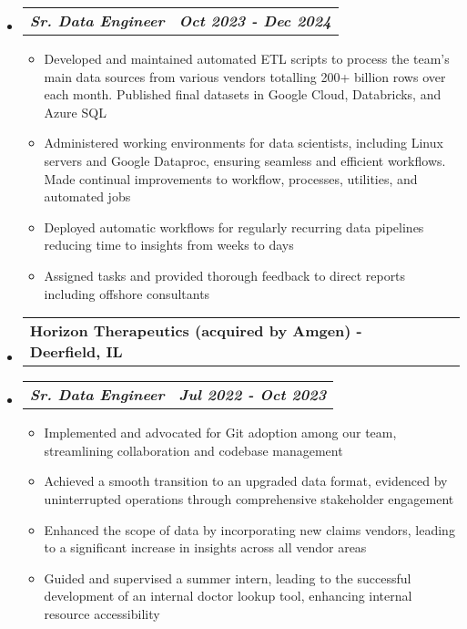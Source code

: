 \documentclass[letterpaper,11pt]{article}
\makeatletter
\newcommand{\resumeItem}[1]{
  \item\small{
    {#1 \vspace{0pt}}
  }
}
\newcommand{\resumeSubheading}[2]{
  \vspace{-1pt}\item
    \begin{tabular*}{0.97\textwidth}[t]{l@{\extracolsep{\fill}}r}
      \textbf{\small#1 - \small#2} 
    \end{tabular*}\vspace{-13pt}
}
\newcommand{\resumeSubSubheading}[2]{
    \item
    \vspace{2pt}
    \begin{tabular*}{0.97\textwidth}{l@{\extracolsep{\fill}}r}
      \textbf{\textit{\small#1}} & \textbf{\textit{\small#2}} \\
    \end{tabular*}\vspace{-5pt}
}
\newcommand{\resumeHeadingListStart}{\begin{itemize}[leftmargin=0.05in, label={}]}
\newcommand{\resumeHeadingListEnd}{\end{itemize}}
\newcommand{\resumeSubHeadingListStart}{\begin{itemize}[leftmargin=0.15in, label={}]}
\newcommand{\resumeSubHeadingListEnd}{\end{itemize}\vspace{-15pt}}
\newcommand{\resumeItemListStart}{\begin{itemize}[leftmargin=0.15in]}
\newcommand{\resumeItemListEnd}{\end{itemize}\vspace{-10pt}}
\makeatother
\begin{document}
        \resumeSubHeadingListStart
            \resumeSubSubheading {Sr. Data Engineer}{Oct 2023 - Dec 2024}
            \resumeItemListStart
                \resumeItem{Developed and maintained automated ETL scripts to process the team's
                            main data sources from various vendors totalling 200+ billion rows over each month. Published 
                            final datasets in Google Cloud, Databricks, and Azure SQL}
                \resumeItem{Administered working environments for data scientists, including Linux servers 
                            and Google Dataproc, ensuring seamless and efficient 
                            workflows. Made continual improvements to workflow, processes, utilities, and automated 
                            jobs}
                \resumeItem{Deployed automatic workflows for regularly recurring data pipelines reducing time to insights from weeks to days}
                \resumeItem{Assigned tasks and provided thorough feedback to direct reports including offshore consultants }
            \resumeItemListEnd
        \resumeSubHeadingListEnd
    \resumeHeadingListStart
        \resumeSubheading{Horizon Therapeutics (acquired by Amgen)}{Deerfield, IL}
    \resumeHeadingListEnd
        \resumeSubHeadingListStart
            \resumeSubSubheading {Sr. Data Engineer}{Jul 2022 - Oct 2023}
            \resumeItemListStart
                \resumeItem{Implemented and advocated for Git adoption among our team, streamlining 
                            collaboration and codebase management}
                \resumeItem{Achieved a smooth transition to an upgraded data format, evidenced by uninterrupted operations through comprehensive stakeholder engagement}
                \resumeItem{Enhanced the scope of data by incorporating new claims vendors, leading to a significant increase in insights across all vendor areas}
                \resumeItem{Guided and supervised a summer intern, leading to the successful development of an internal doctor lookup tool, enhancing internal resource accessibility}
            \resumeItemListEnd
        \resumeSubHeadingListEnd
\end{document}
